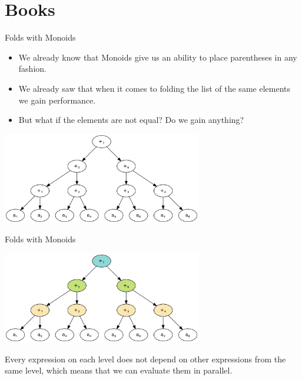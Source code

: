 \documentclass[presentation,aspectratio=169,smaller]{beamer}
\begin{document}
\section*{Books}
\label{sec:org504f9e8}

\begin{frame}[label={sec:orgf4e5b12}]{Folds with Monoids}
\begin{itemize}
\item We already know that Monoids give us an ability to place parentheses in any
fashion.
\item We already saw that when it comes to folding the list of the same elements we
gain performance.
\item But what if the elements are not equal? Do we gain anything?
\end{itemize}

\pause
\begin{center}
\includegraphics[height=4cm]{.dot/fold-parallel-1.png}
\end{center}
\end{frame}

\begin{frame}[label={sec:orgc086469}]{Folds with Monoids}
\begin{center}
\includegraphics[height=4cm]{.dot/fold-parallel-2.png}
\end{center}

Every expression on each level does not depend on other expressions from the
same level, which means that we can evaluate them in parallel.
\end{frame}
\end{document}
